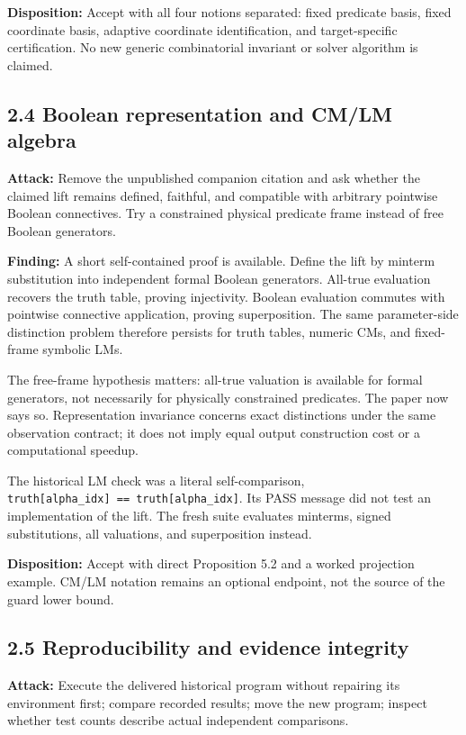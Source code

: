 \documentclass[
  11pt,
]{article}
\begin{document}
\textbf{Disposition:} Accept with all four notions separated: fixed
predicate basis, fixed coordinate basis, adaptive coordinate
identification, and target-specific certification. No new generic
combinatorial invariant or solver algorithm is claimed.

\subsection{2.4 Boolean representation and CM/LM
algebra}\label{boolean-representation-and-cmlm-algebra}

\textbf{Attack:} Remove the unpublished companion citation and ask
whether the claimed lift remains defined, faithful, and compatible with
arbitrary pointwise Boolean connectives. Try a constrained physical
predicate frame instead of free Boolean generators.

\textbf{Finding:} A short self-contained proof is available. Define the
lift by minterm substitution into independent formal Boolean generators.
All-true evaluation recovers the truth table, proving injectivity.
Boolean evaluation commutes with pointwise connective application,
proving superposition. The same parameter-side distinction problem
therefore persists for truth tables, numeric CMs, and fixed-frame
symbolic LMs.

The free-frame hypothesis matters: all-true valuation is available for
formal generators, not necessarily for physically constrained
predicates. The paper now says so. Representation invariance concerns
exact distinctions under the same observation contract; it does not
imply equal output construction cost or a computational speedup.

The historical LM check was a literal self-comparison,
\texttt{truth{[}alpha\_idx{]}\ ==\ truth{[}alpha\_idx{]}}. Its PASS
message did not test an implementation of the lift. The fresh suite
evaluates minterms, signed substitutions, all valuations, and
superposition instead.

\textbf{Disposition:} Accept with direct Proposition 5.2 and a worked
projection example. CM/LM notation remains an optional endpoint, not the
source of the guard lower bound.

\subsection{2.5 Reproducibility and evidence
integrity}\label{reproducibility-and-evidence-integrity}

\textbf{Attack:} Execute the delivered historical program without
repairing its environment first; compare recorded results; move the new
program; inspect whether test counts describe actual independent
comparisons.
\end{document}
